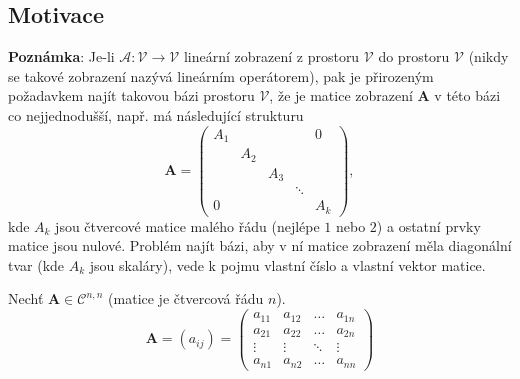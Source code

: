 {    \subsection{Motivace} 
      \textbf{Poznámka}: Je-li \(\mathcal{A} : \mathcal{V} \rightarrow \mathcal{V}\) lineární 
      zobrazení z prostoru \(\mathcal{V}\) do prostoru \(\mathcal{V}\) (nikdy se takové zobrazení 
      nazývá lineárním operátorem), pak je přirozeným požadavkem najít takovou bázi prostoru 
      \(\mathcal{V}\), že je matice zobrazení $\mathbf{A}$ v této bázi co nejjednodušší, např. má 
      následující strukturu
      \begin{equation*}
         \mathbf{A}=
           \left(\begin{array}{ccccc}
             \boxed{A_1}       &             &       &       & 0   \\
                 & \boxed{A_2} &             &       &             \\
                 &             & \boxed{A_3} &       &             \\
                 &             &             &\ddots &             \\
              0  &             &             &       & \boxed{A_k}
            \end{array}
           \right),
     \end{equation*}
     kde \(A_k\) jsou čtvercové matice malého řádu (nejlépe \(1\) nebo \(2\)) a ostatní prvky 
     matice jsou nulové. Problém najít bázi, aby v ní matice zobrazení měla diagonální tvar (kde 
     \(A_k\) jsou skaláry), vede k pojmu vlastní číslo a vlastní vektor matice.

      \begin{definition} 
        Nechť \(\mathbf{A}\in \mathcal{C}^{n,n}\) (matice je čtvercová řádu \(n\)).
        \begin{equation}
          \mathbf{A} = (a_{ij}) =
            \begin{pmatrix}
              a_{11} & a_{12} & \ldots & a_{1n} \\
              a_{21} & a_{22} & \ldots & a_{2n} \\
              \vdots & \vdots & \ddots & \vdots \\
              a_{n1} & a_{n2} & \ldots & a_{nn}
            \end{pmatrix}
        \end{equation}


\end{definition}}
